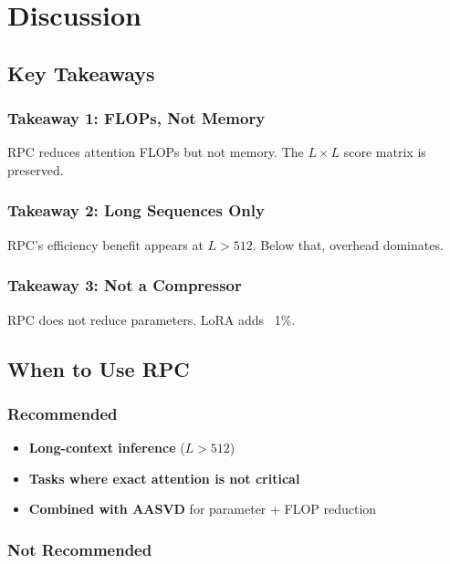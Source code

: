 
\section{Discussion}

\subsection{Key Takeaways}

\subsubsection{Takeaway 1: FLOPs, Not Memory}

RPC reduces attention FLOPs but not memory. The $L \times L$ score matrix 
is preserved.

\subsubsection{Takeaway 2: Long Sequences Only}

RPC's efficiency benefit appears at $L > 512$. Below that, overhead 
dominates.

\subsubsection{Takeaway 3: Not a Compressor}

RPC does not reduce parameters. LoRA adds ~1\%.

\subsection{When to Use RPC}

\subsubsection{Recommended}

\begin{itemize}
\item \textbf{Long-context inference} ($L > 512$)
\item \textbf{Tasks where exact attention is not critical}
\item \textbf{Combined with AASVD} for parameter + FLOP reduction

\end{itemize}
\subsubsection{Not Recommended}

